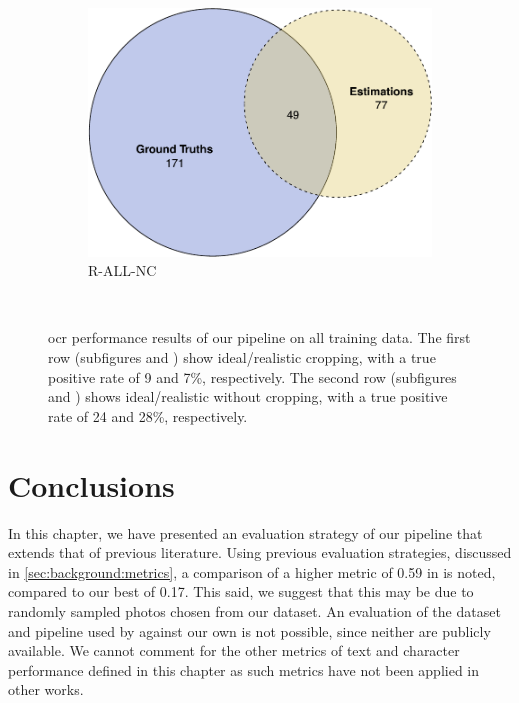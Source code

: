 \begin{figure}[h]
\begin{subfigure}[b]{0.475\textwidth}
    \includegraphics[width=\textwidth]{images/evaluation/ocr_overlap_r_all_nc}
    \caption{R-ALL-NC}
    \label{fig:evaluation:results:ocr:r_all_nc}
  \end{subfigure}
  \hspace{\fill} 
  \bigskip
  \\
  \caption[OCR performance results]{\gls{ocr} performance results of our pipeline on all training data. The first row (subfigures  and ) show ideal/realistic cropping, with a true positive rate of 9 and 7\%, respectively. The second row (subfigures  and ) shows ideal/realistic without cropping, with a true positive rate of 24 and 28\%, respectively.}
  \label{fig:evaluation:results:ocr}
\end{figure}

\clearpage
\section{Conclusions}

In this chapter, we have presented an evaluation strategy of our pipeline that extends that of previous literature. Using previous evaluation strategies, discussed in \cref{sec:background:metrics}, a comparison of a higher \fscore{} metric of 0.59 in \citet{Benami:2012jf} is noted, compared to our best of 0.17. This said, we suggest that this may be due to randomly sampled photos chosen from our dataset. An evaluation of the dataset and pipeline used by \citeauthor{Benami:2012jf} against our own is not possible, since neither are publicly available. We cannot comment for the other metrics of text and character performance defined in this chapter as such metrics have not been applied in other works. 

